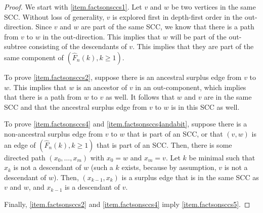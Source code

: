 \begin{proof}
We start with \ref{item.factsonsccs1}. Let $v$ and $w$ be two vertices in the same SCC. Without loss of generality, $v$ is explored first in depth-first order in the out-direction. Since $v$ and $w$ are part of the same SCC, we know that there is a path from $v$ to $w$ in the out-direction. This implies that $w$ will be part of the out-subtree consisting of the descendants of $v$. This implies that they are part of the same component of $(\hat{F}_n(k),k\geq 1)$.

To prove \ref{item.factsonsccs2}, suppose there is an ancestral surplus edge from $v$ to $w$. This implies that $w$ is an ancestor of $v$ in an out-component, which implies that there is a path from $w$ to $v$ as well. It follows that $w$ and $v$ are in the same SCC and that the ancestral surplus edge from $v$ to $w$ is in this SCC as well. 

To prove \ref{item.factsonsccs4} and \ref{item.factsonsccs4andabit}, suppose there is a non-ancestral surplus edge from $v$ to $w$ that is part of an SCC, or that $(v,w)$ is an edge of $(\hat{F}_n(k),k\geq 1)$ that is part of an SCC. Then, there is some directed path $(x_0,\dots, x_m)$ with $x_0=w$ and $x_m=v$. Let $k$ be minimal such that $x_k$ is not a descendant of $w$ (such a $k$ exists, because by assumption, $v$ is not a descendant of $w$). Then, $(x_{k-1},x_k)$ is a surplus edge that is in the same SCC as $v$ and $w$, and $x_{k-1}$ is a descendant of $v$. 


Finally, \ref{item.factsonsccs2} and \ref{item.factsonsccs4} imply \ref{item.factsonsccs5}. 
\end{proof}

